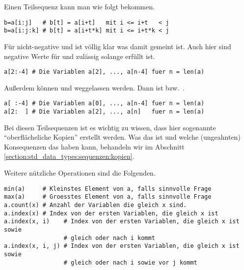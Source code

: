 Einen Teilsequenz kann man wie folgt bekommen.
\begin{lstlisting}
b=a[i:j]   # b[t] = a[i+t]   mit i <= i+t   < j
b=a[i:j:k] # b[t] = a[i+t*k] mit i <= i+t*k < j
\end{lstlisting}
Für nicht-negative  und  ist völlig klar was damit gemeint ist.
Auch hier sind negative Werte für  und  zulässig solange  erfüllt ist.
\begin{lstlisting}
a[2:-4] # Die Variablen a[2], ..., a[n-4] fuer n = len(a)
\end{lstlisting}
Außerdem können  und  weggelassen werden.
Dann ist  bzw.\ .
\begin{lstlisting}
a[ :-4] # Die Variablen a[0], ..., a[n-4] fuer n = len(a)
a[2:  ] # Die Variablen a[2], ..., a[n]   fuer n = len(a)
\end{lstlisting}
Bei diesen Teilsequenzen ist es wichtig zu wissen, dass hier sogenannte ``oberflächeliche Kopien'' erstellt werden.
Was das ist und welche (ungeahnten) Konsequenzen das haben kann, behandeln wir im Abschnitt \ref{section:std_data_types:sequenzen:kopien}.

Weitere nützliche Operationen sind die Folgenden.
\begin{lstlisting}
min(a)     # Kleinstes Element von a, falls sinnvolle Frage
max(a)     # Groesstes Element von a, falls sinnvolle Frage
a.count(x) # Anzahl der Variablen die gleich x sind.
a.index(x) # Index von der ersten Variablen, die gleich x ist
a.index(x, i)    # Index von der ersten Variablen, die gleich x ist sowie
                 # gleich oder nach i kommt
a.index(x, i, j) # Index von der ersten Variablen, die gleich x ist sowie
                 # gleich oder nach i sowie vor j kommt
\end{lstlisting}


